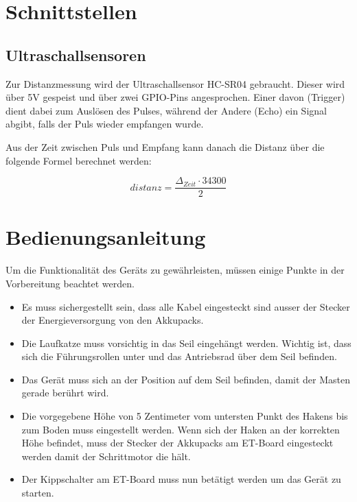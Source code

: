 \documentclass[a4paper]{report}
\begin{document}
\section{Schnittstellen}
\label{sec:Schnittstellen}

\subsection{Ultraschallsensoren}
\label{ssec:UltrasonicSensorInterface}

Zur Distanzmessung wird der Ultraschallsensor HC-SR04 gebraucht. Dieser wird über 5V gespeist und über zwei GPIO-Pins angesprochen. Einer davon (Trigger) dient dabei zum Auslösen des Pulses, während der Andere (Echo) ein Signal abgibt, falls der Puls wieder empfangen wurde.

Aus der Zeit zwischen Puls und Empfang kann danach die Distanz über die folgende Formel berechnet werden:

\begin{equation*}
	distanz = \frac{\Delta_{Zeit} \cdot 34300}{2}
\end{equation*}

\section{Bedienungsanleitung}
\label{sec:Bedienungsanleitung}
Um die Funktionalität des Geräts zu gewährleisten, müssen einige Punkte in der Vorbereitung beachtet werden.

\begin{itemize}
	\item Es muss sichergestellt sein, dass alle Kabel eingesteckt sind ausser der Stecker der Energieversorgung von den Akkupacks.
	\item Die Laufkatze muss vorsichtig in das Seil eingehängt werden. Wichtig ist, dass sich die Führungsrollen unter und das Antriebsrad über dem Seil befinden.
	\item Das Gerät muss sich an der Position auf dem Seil befinden, damit der Masten gerade berührt wird.
	\item Die vorgegebene Höhe von 5 Zentimeter vom untersten Punkt des Hakens bis zum Boden muss eingestellt werden. Wenn sich der Haken an der korrekten Höhe befindet, muss der Stecker der Akkupacks am ET-Board eingesteckt werden damit der Schrittmotor die hält.
	\item Der Kippschalter am ET-Board muss nun betätigt werden um das Gerät zu starten.
\end{itemize}
\end{document}

